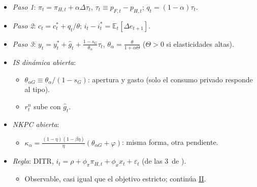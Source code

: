\documentclass{article}
\begin{document}
\begin{columnas}
\begin{itemize}
\item \emph{Paso 1}: $\pi_t=\pi_{H,t}+\alpha\Delta\tau_t$, $\tau_t\equiv p_{F,t}-p_{H,t}$; $q_t=(1-\alpha)\tau_t$.
\item \emph{Paso 2}: $c_t=c^*_t+q_t/\theta$; $i_t-i^*_t=\mathbb{E}_t[\Delta e_{t+1}]$.
\item \emph{Paso 3}: $y_t=y^*_t+\hat g_t+\frac{1-s_G}{\theta_\alpha}\tau_t$, $\theta_\alpha=\frac{\theta}{1+\alpha\Theta}$ ($\Theta>0$ si elasticidades altas).
\item \emph{IS dinámica abierta}:
  \begin{itemize}
  \item $\theta_{\alpha G}\equiv\theta_\alpha/(1-s_G)$: apertura y gasto (solo el consumo privado responde al tipo).
  \item $r^n_t$ sube con $\hat g_t$.
  \end{itemize}
\item \emph{NKPC abierta}:
  \begin{itemize}
  \item $\kappa_\alpha=\tfrac{(1-\eta)(1-\beta\eta)}{\eta}(\theta_{\alpha G}+\varphi)$: misma forma, otra pendiente.
  \end{itemize}
\item \emph{Regla}: DITR, $i_t=\rho+\phi_\pi\pi_{H,t}+\phi_x x_t+\varepsilon_t$ (de las 3~de ).
  \begin{itemize}
  \item Observable, casi igual que el objetivo estricto; continúa \hyperref[rep:II]{II}.
  \end{itemize}
\end{itemize}


\end{columnas}
\end{document}
